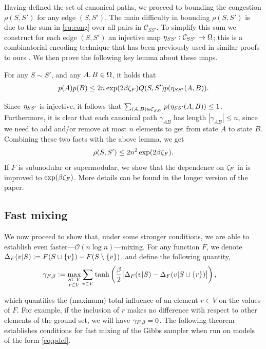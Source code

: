 Having defined the set of canonical paths, we proceed to bounding the congestion $\rho(S, S')$ for any edge $(S, S')$.
The main difficulty in bounding $\rho(S, S')$ is due to the sum in \eqref{eq:cong} over all pairs in $\mathcal{C}_{SS'}$.
To simplify this sum we construct for each edge $(S, S')$ an injective map $\ess : \mathcal{C}_{SS'} \to \ss$; this is a combinatorial encoding technique that has been previously used in similar proofs to ours \cite{jerrum03}.
We then prove the following key lemma about these maps.

\begin{lemma} \label{lem:poly}
  For any $S \sim S'$, and any $A, B \in \ss$, it holds that
  \begin{align*}
  	p(A)p(B) \leq 2n\exp(2 \beta \zf)Q(S, S')p(\ess(A, B)).
  \end{align*}
\end{lemma}

Since $\ess$ is injective, it follows that $\sum_{(A, B) \in \mathcal{C}_{SS'}} p(\ess(A, B)) \leq 1$.
Furthermore, it is clear that each canonical path $\gamma_{AB}$ has length $|\gamma_{AB}| \leq n$, since we need to add and/or remove at most $n$ elements to get from state $A$ to state $B$.
Combining these two facts with the above lemma, we get
\begin{align*}
  \rho(S, S') \leq 2n^2 \exp(2 \beta \zf).
\end{align*}
If $F$ is submodular or supermodular, we show that the dependence on $\zf$ in   is improved to $\exp(\beta \zf)$.
More details can be found in the longer version of the paper.

\subsection{Fast mixing}
We now proceed to show that, under some stronger conditions, we are able to establish even faster---$\mathcal{O}(n \log n)$---mixing.
For any function $F$, we denote $\D_F(v|S) \defeq F(S \cup \{v\}) - F(S \setminus \{v\})$, and define the following quantity,
\begin{align*}
  \gf &\defeq \max_{\substack{S \subseteq V\\r \in V}} \sum_{\substack{v \in V}} \tanh\left(\frac{\beta}{2} \big|\D_F(v|S) - \D_F(v|S \cup \{r\})\big| \right),
\end{align*}

which quantifies the (maximum) total influence of an element $r \in V$ on the values of $F$.
For example, if the inclusion of $r$ makes no difference with respect to other elements of the ground set, we will have $\gf = 0$.
The following theorem establishes conditions for fast mixing of the Gibbs sampler when run on models of the form \eqref{eq:pdef}.

